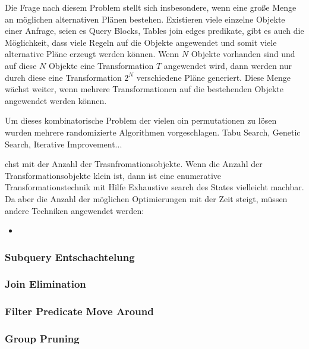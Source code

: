 Die Frage nach diesem Problem stellt sich insbesondere, wenn eine große Menge an möglichen alternativen Plänen bestehen. Existieren viele einzelne Objekte einer Anfrage, seien es Query Blocks, Tables join edges predikate, gibt es auch die Möglichkeit, dass viele Regeln auf die Objekte angewendet und somit viele alternative Pläne erzeugt werden können. Wenn $N$ Objekte vorhanden sind und auf diese $N$ Objekte eine Transformation $T$ angewendet wird, dann werden nur durch diese eine Transformation $2^N$ verschiedene Pläne generiert. Diese  Menge wächst weiter, wenn mehrere Transformationen auf die bestehenden Objekte angewendet werden können. 


Um dieses kombinatorische Problem der vielen oin permutationen zu lösen wurden mehrere randomizierte Algorithmen vorgeschlagen. Tabu Search, Genetic Search, Iterative Improvement...

chst mit der Anzahl der Trasnfromationsobjekte. Wenn die Anzahl der Transformationsobjekte klein ist, dann ist eine enumerative Transformationstechnik mit Hilfe Exhaustive search des States vielleicht machbar. Da aber die Anzahl der möglichen Optimierungen mit der Zeit steigt, müssen andere Techniken angewendet werden:

\begin{itemize}
\item 
\end{itemize}

\subsubsection{Subquery Entschachtelung}

\subsubsection{Join Elimination}

\subsubsection{Filter Predicate Move Around}

\subsubsection{Group Pruning}
